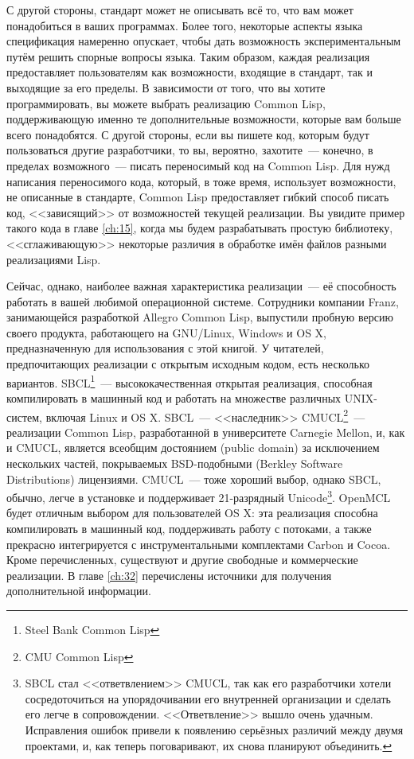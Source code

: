 С другой стороны, стандарт может не описывать всё то, что вам может понадобиться в
ваших программах. Более того, некоторые аспекты языка спецификация намеренно
опускает, чтобы дать возможность экспериментальным путём решить спорные вопросы языка.
Таким образом, каждая реализация предоставляет пользователям как возможности, входящие в
стандарт, так и выходящие за его пределы. В зависимости от того, что вы хотите
программировать, вы можете выбрать реализацию Common Lisp, поддерживающую именно те
дополнительные возможности, которые вам больше всего понадобятся. С другой стороны,
если вы пишете код, которым будут пользоваться другие разработчики, то
вы, вероятно, захотите~--- конечно, в пределах возможного~--- писать переносимый код на
Common Lisp. Для нужд написания переносимого кода, который, в тоже время, использует
возможности, не описанные в стандарте, Common Lisp предоставляет гибкий способ писать код,
<<зависящий>> от возможностей текущей реализации. Вы увидите пример такого кода в главе
\ref{ch:15}, когда мы будем разрабатывать простую библиотеку, <<сглаживающую>> некоторые
различия в обработке имён файлов разными реализациями Lisp.

Сейчас, однако, наиболее важная характеристика реализации~--- её способность работать в
вашей любимой операционной системе. Сотрудники компании Franz, занимающейся разработкой
Allegro Common Lisp, выпустили пробную версию своего продукта, работающего на GNU/Linux,
Windows и OS X, предназначенную для использования с этой книгой. У читателей,
предпочитающих реализации с открытым исходным кодом, есть несколько
вариантов. SBCL\footnote{Steel Bank Common Lisp}~--- высококачественная открытая
реализация, способная компилировать в машинный код и работать на множестве различных
UNIX-систем, включая Linux и OS X. SBCL~--- <<наследник>> CMUCL\footnote{CMU Common
  Lisp}~--- реализации Common Lisp, разработанной в университете Carnegie Mellon,
и, как и CMUCL, является всеобщим достоянием (public domain) за исключением нескольких
частей, покрываемых BSD-подобными (Berkley Software Distributions) лицензиями. CMUCL~---
тоже хороший выбор, однако SBCL, обычно, легче в установке и поддерживает 21-разрядный
Unicode\footnote{SBCL стал <<ответвлением>> CMUCL, так как его разработчики хотели
  сосредоточиться на упорядочивании его внутренней организации и сделать его легче в
  сопровождении. <<Ответвление>> вышло очень удачным. Исправления ошибок привели к появлению
  серьёзных различий между двумя проектами, и, как теперь поговаривают, их снова планируют
  объединить.}. OpenMCL будет отличным выбором для пользователей OS X: эта
реализация способна компилировать в машинный код, поддерживать работу с потоками, а также
прекрасно интегрируется с инструментальными комплектами Carbon и Cocoa. Кроме
перечисленных, существуют и другие свободные и коммерческие реализации. В главе \ref{ch:32}
перечислены источники для получения дополнительной информации.

